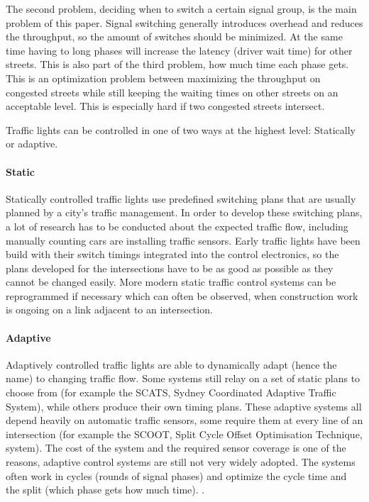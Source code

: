 The second problem, deciding when to switch a certain signal group, is the main problem of this paper. Signal switching generally introduces overhead and reduces the throughput, so the amount of switches should be minimized. At the same time having to long phases will increase the latency (driver wait time) for other streets. This is also part of the third problem, how much time each phase gets. This is an optimization problem between maximizing the throughput on congested streets while still keeping the waiting times on other streets on an acceptable level. This is especially hard if two congested streets intersect.

Traffic lights can be controlled in one of two ways at the highest level: Statically or adaptive.

\paragraph{Static} Statically controlled traffic lights use predefined switching plans that are usually planned by a city's traffic management. In order to develop these switching plans, a lot of research has to be conducted about the expected traffic flow, including manually counting cars are installing traffic sensors. Early traffic lights have been build with their switch timings integrated into the control electronics, so the plans developed for the intersections have to be as good as possible as they cannot be changed easily. More modern static traffic control systems can be reprogrammed if necessary which can often be observed, when construction work is ongoing on a link adjacent to an intersection.

\paragraph{Adaptive} Adaptively controlled traffic lights are able to dynamically adapt (hence the name) to changing traffic flow. Some systems still relay on a set of static plans to choose from (for example the SCATS, Sydney Coordinated Adaptive Traffic System), while others produce their own timing plans. These adaptive systems all depend heavily on automatic traffic sensors, some require them at every line of an intersection (for example the SCOOT, Split Cycle Offset Optimisation Technique, system). The cost of the system and the required sensor coverage is one of the reasons, adaptive control systems are still not very widely adopted. The systems often work in cycles (rounds of signal phases) and optimize the cycle time and the split (which phase gets how much time). \cite{atcs_overview}.

